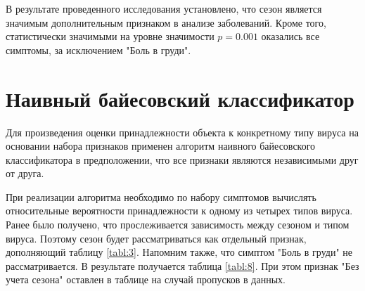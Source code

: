 \documentclass{article}
\begin{document}
В результате проведенного исследования  установлено, что сезон является значимым дополнительным признаком в анализе заболеваний. Кроме того, статистически значимыми на уровне значимости $p=0.001$ оказались все симптомы, за исключением "Боль в груди". 

\section{Наивный байесовский классификатор}

Для произведения оценки принадлежности объекта к конкретному типу вируса на основании набора признаков применен алгоритм наивного байесовского классификатора в предположении, что все признаки являются независимыми друг от друга.

При реализации алгоритма необходимо по набору симптомов вычислять относительные вероятности принадлежности к одному из четырех типов вируса. Ранее было получено, что прослеживается зависимость между сезоном и типом вируса. Поэтому сезон будет рассматриваться как отдельный признак, дополняющий таблицу \ref{tabl:3}. Напомним также, что симптом{ }"Боль в груди"{ }не рассматривается. В результате получается таблица \ref{tabl:8}. При этом признак "Без учета сезона"{ }оставлен в таблице на случай пропусков в данных.
\end{document}
